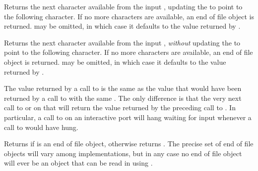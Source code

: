 \begin{entry}{%
}

Returns the next character available from the input , updating
the  to point to the following character.  If no more characters
are available, an end of file object is returned.   may be
omitted, in which case it defaults to the value returned by .

\end{entry}


\begin{entry}{%
}

Returns the next character available from the input ,
{\em without} updating
the  to point to the following character.  If no more characters
are available, an end of file object is returned.   may be
omitted, in which case it defaults to the value returned by .

\begin{note}
The value returned by a call to  is the same as the
value that would have been returned by a call to  with the
same .  The only difference is that the very next call to
 or  on that  will return the
value returned by the preceding call to .  In particular, a call
to  on an interactive port will hang waiting for input
whenever a call to  would have hung.
\end{note}

\end{entry}


\begin{entry}{%
}

Returns \schtrue{} if  is an end of file object, otherwise returns
\schfalse.  The precise set of end of file objects will vary among
implementations, but in any case no end of file object will ever be an object
that can be read in using .

\end{entry}


